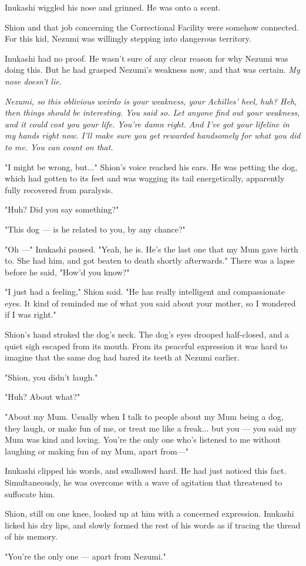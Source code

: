 Inukashi wiggled his nose and grinned. He was onto a scent.

Shion and that job concerning the Correctional Facility were somehow
connected. For this kid, Nezumi was willingly stepping into dangerous
territory.

Inukashi had no proof. He wasn't sure of any clear reason for why Nezumi
was doing this. But he had grasped Nezumi's weakness now, and that was
certain. \emph{My nose doesn't lie.}

\emph{Nezumi, so this oblivious weirdo is your weakness, your Achilles' heel,
huh? Heh, then things should be interesting. You said so. Let anyone
find out your weakness, and it could cost you your life. You're damn
right. And I've got your lifeline in my hands right now. I'll make sure
you get rewarded handsomely for what you did to me. You can count on
that.}

"I might be wrong, but..." Shion's voice reached his ears. He was
petting the dog, which had gotten to its feet and was wagging its tail
energetically, apparently fully recovered from paralysis.

"Huh? Did you say something?"

"This dog --- is he related to you, by any chance?"

"Oh ---" Inukashi paused. "Yeah, he is. He's the last one that my Mum gave
birth to. She had him, and got beaten to death shortly afterwards."
There was a lapse before he said, "How'd you know?"

"I just had a feeling," Shion said. "He has really intelligent and
compassionate eyes. It kind of reminded me of what you said about your
mother, so I wondered if I was right."

Shion's hand stroked the dog's neck. The dog's eyes drooped half-closed,
and a quiet sigh escaped from its mouth. From its peaceful expression it
was hard to imagine that the same dog had bared its teeth at Nezumi
earlier.

"Shion, you didn't laugh."

"Huh? About what?"

"About my Mum. Usually when I talk to people about my Mum being a dog,
they laugh, or make fun of me, or treat me like a freak... but you --- you
said my Mum was kind and loving. You're the only one who's listened to
me without laughing or making fun of my Mum, apart from---"

Inukashi clipped his words, and swallowed hard. He had just noticed this
fact. Simultaneously, he was overcome with a wave of agitation that
threatened to suffocate him.

Shion, still on one knee, looked up at him with a concerned expression.
Inukashi licked his dry lips, and slowly formed the rest of his words as
if tracing the thread of his memory.

"You're the only one --- apart from Nezumi."